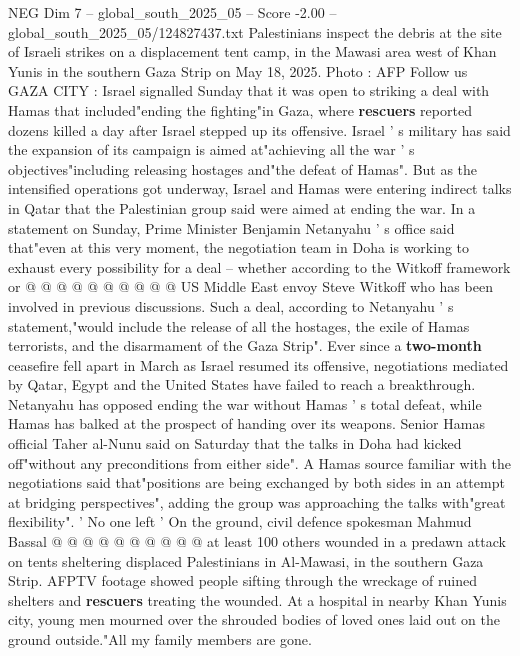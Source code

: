 \begin{textsample}{NEG Dim 7 – global\_south\_2025\_05 – Score -2.00 – global\_south\_2025\_05/124827437.txt}  \label{ex:f7_neg_003}
Palestinians inspect the debris at the site of Israeli strikes on a displacement tent camp, in the Mawasi area west of Khan Yunis in the southern Gaza Strip on May 18, 2025.
Photo : AFP Follow us GAZA CITY : Israel signalled Sunday that it was open to striking a deal with Hamas that included"ending the fighting"in Gaza, where \textbf{rescuers} reported dozens killed a day after Israel stepped up its offensive.
Israel ' s military has said the expansion of its campaign is aimed at"achieving all the war ' s objectives"including releasing hostages and"the defeat of Hamas".
But as the intensified operations got underway, Israel and Hamas were entering indirect talks in Qatar that the Palestinian group said were aimed at ending the war.
In a statement on Sunday, Prime Minister Benjamin Netanyahu ' s office said that"even at this very moment, the negotiation team in Doha is working to exhaust every possibility for a deal -- whether according to the Witkoff framework or @ @ @ @ @ @ @ @ @ @ US Middle East envoy Steve Witkoff who has been involved in previous discussions.
Such a deal, according to Netanyahu ' s statement,"would include the release of all the hostages, the exile of Hamas terrorists, and the disarmament of the Gaza Strip".
Ever since a \textbf{two-month} ceasefire fell apart in March as Israel resumed its offensive, negotiations mediated by Qatar, Egypt and the United States have failed to reach a breakthrough.
Netanyahu has opposed ending the war without Hamas ' s total defeat, while Hamas has balked at the prospect of handing over its weapons.
Senior Hamas official Taher al-Nunu said on Saturday that the talks in Doha had kicked off"without any preconditions from either side".
A Hamas source familiar with the negotiations said that"positions are being exchanged by both sides in an attempt at bridging perspectives", adding the group was approaching the talks with"great flexibility". ' No one left ' On the ground, civil defence spokesman Mahmud Bassal @ @ @ @ @ @ @ @ @ @ at least 100 others wounded in a predawn attack on tents sheltering displaced Palestinians in Al-Mawasi, in the southern Gaza Strip.
AFPTV footage showed people sifting through the wreckage of ruined shelters and \textbf{rescuers} treating the wounded.
At a hospital in nearby Khan Yunis city, young men mourned over the shrouded bodies of loved ones laid out on the ground outside."All my family members are gone.

\end{textsample}
